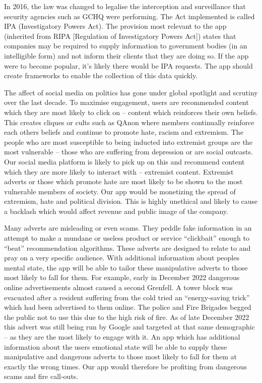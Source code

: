\documentclass[10pt,\jkfside,a4paper]{article}
\begin{document}
In 2016, the law was changed to legalise the interception and
surveillance that security agencies such as GCHQ were performing. The Act
implemented is called IPA (Investigatory Powers Act). The provision most
relevant to the app (inherited from RIPA [Regulation of Investigatory
Powers Act]) states that companies may be required to supply information
to government bodies (in an intelligible form) and not inform their clients
that they are doing so. If the app were to become popular, it's likely there
would be IPA requests. The app should create frameworks to enable the
collection of this data quickly.

The affect of social media on politics has gone under global spotlight and
scrutiny over the last decade. To maximise engagement, users are recommended
content which they are most likely to click on -- content which reinforces
their own beliefs. This creates cliques or cults such as QAnon where members
continually reinforce each others beliefs and continue to promote hate,
racism and extremism. The people who are most susceptible to being inducted
into extremist groups are the most vulnerable -- those who are suffering from
depression or are social outcasts. Our social media platform is likely to
pick up on this and recommend content which they are more likely to interact
with -- extremist content. Extremist adverts or those which promote hate are
most likely to be shown to the most vulnerable members of society. Our app
would be monetizing the spread of extremism, hate and political division.
This is highly unethical and likely to cause a backlash which would affect
revenue and public image of the company.

Many adverts are misleading or even scams. They peddle fake information in an
attempt to make a mundane or useless product or service ``clickbait'' enough
to ``beat'' recommendation algorithms. These adverts are designed to relate
to and pray on a very specific audience. With additional information about
peoples mental state, the app will be able to tailor these manipulative
adverts to those most likely to fall for them. For example, early in
December 2022 dangerous online advertisements almost caused a second Grenfell.
A tower block was evacuated after a resident suffering from the cold tried
an ``energy-saving trick'' which had been advertised to them online. The
police and Fire Brigades begged the public not to use this due to the high
risk of fire. As of late December 2022 this advert was still being run
by Google and targeted at that same demographic -- as they are the most
likely to engage with it. An app which has additional information about the
users emotional state will be able to supply these manipulative and
dangerous adverts to those most likely to fall for them at exactly the wrong
times. Our app would therefore be profiting from dangerous scams and fire
call-outs.
\end{document}
